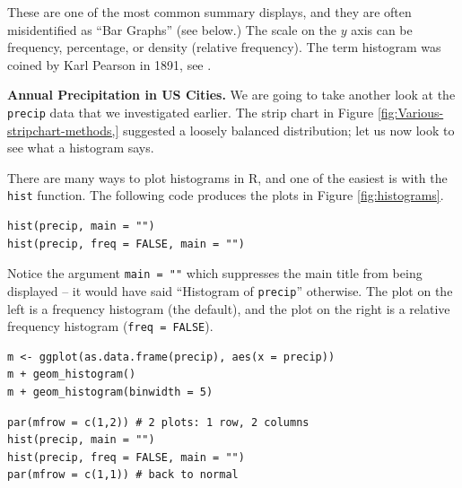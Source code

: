 \documentclass[captions=tableheading]{scrbook}
\begin{document}
These are one of the most common summary displays, and they are often misidentified as ``Bar Graphs'' (see below.) The scale on the \(y\) axis can be frequency, percentage, or density (relative frequency). The term histogram was coined by Karl Pearson in 1891, see \cite{Miller}.

\begin{example}
\textbf{Annual Precipitation in US Cities.} We are going to take another look at the \texttt{precip} data that we investigated earlier. The strip chart in Figure \ref{fig:Various-stripchart-methods,} suggested a loosely balanced distribution; let us now look to see what a histogram says. 

There are many ways to plot histograms in \textsf{R}, and one of the easiest is with the \texttt{hist} function. The following code produces the plots in Figure \ref{fig:histograms}.


\begin{verbatim}
hist(precip, main = "")
hist(precip, freq = FALSE, main = "")
\end{verbatim}

Notice the argument \texttt{main = ""} which suppresses the main title from being displayed -- it would have said ``Histogram of \texttt{precip}'' otherwise. The plot on the left is a frequency histogram (the default), and the plot on the right is a relative frequency histogram (\texttt{freq = FALSE}). 


\begin{verbatim}
m <- ggplot(as.data.frame(precip), aes(x = precip))
m + geom_histogram()
m + geom_histogram(binwidth = 5)
\end{verbatim}




\begin{verbatim}
par(mfrow = c(1,2)) # 2 plots: 1 row, 2 columns
hist(precip, main = "")
hist(precip, freq = FALSE, main = "")
par(mfrow = c(1,1)) # back to normal
\end{verbatim}




\end{example}
\end{document}
